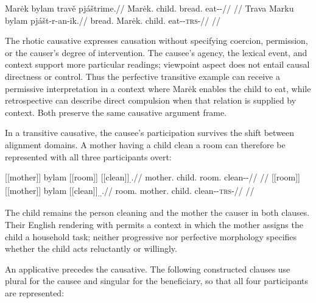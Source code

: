 \pex\label{ex:val-caus-transitive}
\a
\begingl
\gla Marėk bylam travě pjáštrime.//
\glb Marėk.\Dir{} child.\Ind{} bread.\Ind{} eat-\Caus{}-\Prog{}//
\glft {}//
\endgl
\a
\begingl
\gla Trava Marku bylam pjášt-r-an-ik.//
\glb bread.\Dir{} Marėk.\Trs{} child.\Ind{} eat-\Caus{}-\textsc{trs}-\Pf{}//
\glft {}//
\endgl
\xe

The rhotic causative expresses causation without specifying coercion, permission, or the
causer's degree of intervention. The causee's agency, the lexical event, and
context support more particular readings; viewpoint aspect does not entail
causal directness or control. Thus the perfective transitive example can
receive a permissive interpretation in a context where Marėk enables the
child to eat, while retrospective  can describe direct
compulsion when that relation is supplied by context. Both preserve the same
causative argument frame.

In a transitive causative, the causee's participation survives the shift
between alignment domains. A mother having a child clean a room can
therefore be represented with all three participants overt:

\pex\label{ex:val-slot-causative}
\a
\begingl
\gla \textnormal{[[mother]]}\textsubscript{\Dir{}} bylam \textnormal{[[room]]}\textsubscript{\Ind{}} \textnormal{[[clean]]}\textsubscript{\Caus{}.\Prog{}}.//
\glb mother.\Dir{} child.\Ind{} room.\Ind{} clean-\Caus{}-\Prog{}//
\glft {}
//
\endgl
\a
\begingl
\gla \textnormal{[[room]]}\textsubscript{\Dir{}} \textnormal{[[mother]]}\textsubscript{\Trs{}} bylam \textnormal{[[clean]]}\textsubscript{\Caus{}.\Trs{}.\Pf{}}.//
\glb room.\Dir{} mother.\Trs{} child.\Ind{} clean-\Caus{}-\textsc{trs}-\Pf{}//
\glft {}
//
\endgl
\xe

The child remains the person cleaning and the mother the causer in both
clauses. Their English rendering with  permits a context in which
the mother assigns the child a household task; neither progressive nor
perfective morphology specifies whether the child acts reluctantly or willingly.

An applicative precedes the causative. The following constructed clauses use
plural  for the causee and singular  for the beneficiary,
so that all four participants are represented:

